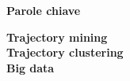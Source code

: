 
\clearemptydoublepage{}
\thispagestyle{empty}
\vspace*{20ex}
\begin{flushright}
    \begin{LARGE}
        \textbf{Parole chiave}\\
        \vspace{5ex}
    \end{LARGE}
    \begin{normalsize}
        \textbf{%
            Trajectory mining\\%
            \medskip
            Trajectory clustering\\%
            \medskip
            Big data%
        }
    \end{normalsize}
\end{flushright}
\vfill
